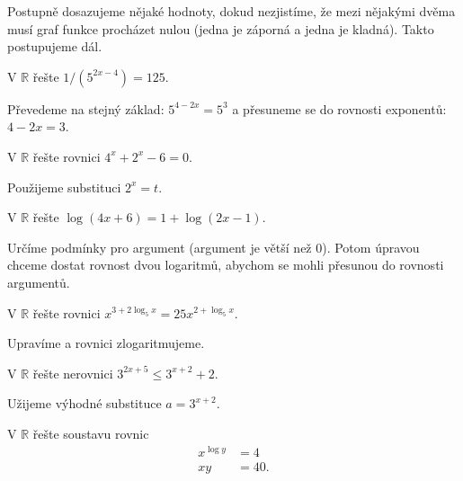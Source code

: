 \begin{reseni}
Postupně dosazujeme nějaké hodnoty, dokud nezjistíme, že mezi nějakými dvěma
musí graf funkce procházet nulou (jedna je záporná a jedna je kladná). Takto postupujeme
dál.
\end{reseni}

\begin{priklad}
V $\mathbb R$ řešte $1/(5^{2x-4})=125.$
\end{priklad}

\begin{reseni}
Převedeme na stejný základ: $5^{4-2x}=5^3$ a přesuneme se do rovnosti exponentů:
$4-2x=3$.
\end{reseni}

\begin{priklad}
V $\mathbb R$ řešte rovnici $4^x+2^x-6=0$.
\end{priklad}

\begin{reseni}
Použijeme substituci $2^x=t.$
\end{reseni}

\begin{priklad}
V $\mathbb R$ řešte $\log (4x+6)=1+\log(2x-1).$
\end{priklad}

\begin{reseni}
Určíme podmínky pro argument (argument je větší než 0). Potom úpravou chceme dostat
rovnost dvou logaritmů, abychom se mohli přesunou do rovnosti argumentů.
\end{reseni}

\begin{priklad}
V $\mathbb R$ řešte rovnici $x^{3+2\log_5 x}=25x^{2+\log_5 x}$.
\end{priklad}

\begin{reseni}
Upravíme a rovnici zlogaritmujeme.
\end{reseni}

\begin{priklad}
V $\mathbb R$ řešte nerovnici $3^{2x+5}\leq 3^{x+2}+2.$
\end{priklad}

\begin{reseni}
Užijeme výhodné substituce $a=3^{x+2}$.
\end{reseni}

\begin{priklad}
V $\mathbb R$ řešte soustavu rovnic
\begin{align*}
    x^{\log y} &= 4\\
    xy &= 40.
\end{align*}
\end{priklad}

